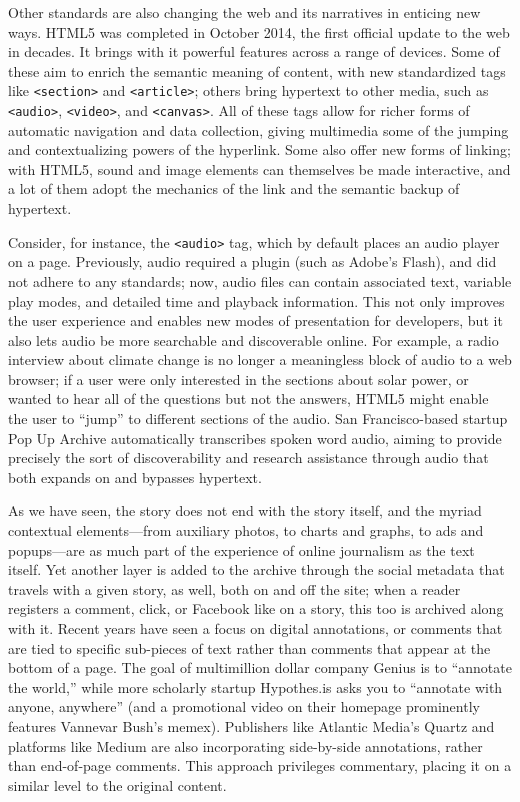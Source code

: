 Other standards are also changing the web and its narratives in enticing new ways. HTML5 was completed in October 2014, the first official update to the web in decades. It brings with it powerful features across a range of devices. Some of these aim to enrich the semantic meaning of content, with new standardized tags like \texttt{<section>} and \texttt{<article>}; others bring hypertext to other media, such as \texttt{<audio>}, \texttt{<video>}, and \texttt{<canvas>}. All of these tags allow for richer forms of automatic navigation and data collection, giving multimedia some of the jumping and contextualizing powers of the hyperlink. Some also offer new forms of linking; with HTML5, sound and image elements can themselves be made interactive, and a lot of them adopt the mechanics of the link and the semantic backup of hypertext.

Consider, for instance, the \texttt{<audio>} tag, which by default places an audio player on a page. Previously, audio required a plugin (such as Adobe's Flash), and did not adhere to any standards; now, audio files can contain associated text, variable play modes, and detailed time and playback information. This not only improves the user experience and enables new modes of presentation for developers, but it also lets audio be more searchable and discoverable online. For example, a radio interview about climate change is no longer a meaningless block of audio to a web browser; if a user were only interested in the sections about solar power, or wanted to hear all of the questions but not the answers, HTML5 might enable the user to ``jump'' to different sections of the audio. San Francisco-based startup Pop Up Archive automatically transcribes spoken word audio, aiming to provide precisely the sort of discoverability and research assistance through audio that both expands on and bypasses hypertext.

As we have seen, the story does not end with the story itself, and the myriad contextual elements---from auxiliary photos, to charts and graphs, to ads and popups---are as much part of the experience of online journalism as the text itself. Yet another layer is added to the archive through the social metadata that travels with a given story, as well, both on and off the site; when a reader registers a comment, click, or Facebook like on a story, this too is archived along with it. Recent years have seen a focus on digital annotations, or comments that are tied to specific sub-pieces of text rather than comments that appear at the bottom of a page. The goal of multimillion dollar company Genius is to ``annotate the world,'' while more scholarly startup Hypothes.is asks you to ``annotate with anyone, anywhere'' (and a promotional video on their homepage prominently features Vannevar Bush's memex). Publishers like Atlantic Media's Quartz and platforms like Medium are also incorporating side-by-side annotations, rather than end-of-page comments. This approach privileges commentary, placing it on a similar level to the original content.

